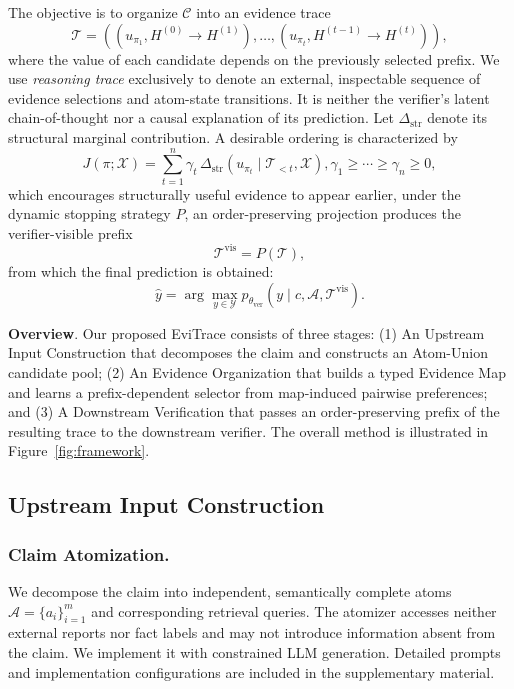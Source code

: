 \documentclass[letterpaper]{article}
\begin{document}
The objective is to organize $\mathcal C$ into an evidence
trace
\[
\mathcal T=((u_{\pi_1},H^{(0)}\to H^{(1)}),\ldots,(u_{\pi_t},H^{(t-1)}\to H^{(t)})),
\]
where the value of each candidate depends on the previously selected
prefix. 
We use \emph{reasoning trace} exclusively to denote an external,
inspectable sequence of evidence selections and atom-state transitions.
It is neither the verifier's latent chain-of-thought nor a causal
explanation of its prediction.
Let $\Delta_{\mathrm{str}}$ denote its structural marginal
contribution. A desirable ordering is characterized by
\[
J(\pi;\mathcal X)
=
\sum_{t=1}^{n}\gamma_t\,
\Delta_{\mathrm{str}}
\!\left(
u_{\pi_t}\mid\mathcal T_{<t},\mathcal X
\right),
\gamma_1\ge\cdots\ge\gamma_n\ge0,
\]
which encourages structurally useful evidence to appear earlier, under the dynamic stopping strategy \(P\), an order-preserving projection
produces the verifier-visible prefix
\[
\mathcal T^{\mathrm{vis}}=P(\mathcal T),
\]
from which the final prediction is obtained:
\[
\hat y
=
\arg\max_{y\in\mathcal Y}
p_{\theta_{\mathrm{ver}}}
\left(y\mid c,\mathcal A,\mathcal T^{\mathrm{vis}}\right).
\]

\textbf{Overview}. Our proposed EviTrace consists of three stages: 
(1) An {Upstream Input Construction} that decomposes the claim and constructs an Atom-Union candidate pool; 
(2) An {Evidence Organization} that builds a typed Evidence Map and learns a prefix-dependent selector from map-induced pairwise preferences; and
(3) A {Downstream Verification} that passes an order-preserving prefix of the resulting trace to the downstream verifier. The overall method is illustrated in Figure~\ref{fig:framework}.

\subsection{Upstream Input Construction}

\subsubsection{Claim Atomization.}

We decompose the claim into independent, semantically complete atoms
$\mathcal A=\{a_i\}_{i=1}^{m}$ and corresponding retrieval queries.
The atomizer accesses neither external reports nor fact labels and may
not introduce information absent from the claim. We implement it with
constrained LLM generation. Detailed prompts and implementation configurations are included in the
supplementary material.
\end{document}
